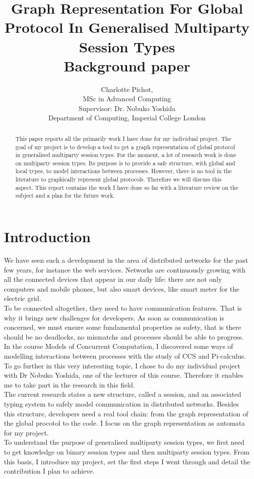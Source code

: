 \documentclass{article}
\title{Graph Representation For Global Protocol In Generalised Multiparty Session Types\\
\large Background paper}
\author{Charlotte Pichot, \\ MSc in Advanced Computing
   \\ Supervisor: Dr. Nobuko Yoshida
   \\ Department of Computing, Imperial College London
}
\begin{document}
\maketitle

\begin{abstract}
This paper reports all the primarily work I have done for my individual project. The goal of my project is to develop a tool to get a graph representation of global protocol in generalised multiparty session types. For the moment, a lot of research work is done on multiparty session types. Its purpose is to provide a safe structure, with global and local types, to model interactions between processes. However, there is no tool in the literature to graphically represent global protocols. Therefore we will discuss this aspect. This report contains the work I have done so far with a literature review on the subject and a plan for the future work.
\end{abstract}

\newpage
\section*{Introduction}

We have seen such a development in the area of distributed networks for the past few years, for instance the web services. Networks are continuously growing with all the connected devices that appear in our daily life: there are not only computers and mobile phones, but also smart devices, like smart meter for the electric grid.\\
To be connected altogether, they need to have communication features. That is why it brings new challenges for developers. As soon as communication is concerned, we must ensure some fundamental properties as safety, that is there should be no deadlocks, no mismatchs and processes should be able to progress. \\
In the course Models of Concurrent Computation, I discovered some ways of modelling interactions between processes with the study of CCS and Pi-calculus. To go further in this very interesting topic, I chose to do my individual project with Dr Nobuko Yoshida, one of the lecturer of this course. Therefore it enables me to take part in the research in this field.\\
The current research states a new structure, called a session, and an associated typing system to safely model communication in distributed networks. Besides this structure, developers need a real tool chain: from the graph representation of the global procotol to the code. I focus on the graph representation as automata for my project.\\
To understand the purpose of generalised multiparty session types, we first need to get knowledge on binary session types and then multiparty session types. From this basis, I introduce my project, set the first steps I went through and detail the contribution I plan to achieve.
\end{document}
